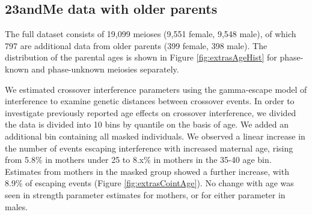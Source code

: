 \subsection{23andMe data with older parents}

The full dataset consists of 19,099 meioses (9,551 female, 9,548 male), of which 797 are additional data from older parents (399 female, 398 male).
The distribution of the parental ages is shown in Figure \ref{fig:extrasAgeHist} for phase-known and phase-unknown meiosies separately.

We estimated crossover interference parameters using the gamma-escape model of interference\cite{Housworth2003} to examine genetic distances between crossover events.
In order to investigate previously reported age effects on crossover interference, we divided the data is divided into 10 bins by quantile on the basis of age.
We added an additional bin containing all masked individuals.
We observed a linear increase in the number of events escaping interference with increased maternal age, rising from 5.8\% in mothers under 25 to 8.x\% in mothers in the 35-40 age bin.
Estimates from mothers in the masked group showed a further increase, with 8.9\% of escaping events (Figure \ref{fig:extrasCointAge}).
No change with age was seen in strength parameter estimates for mothers, or for either parameter in males.



